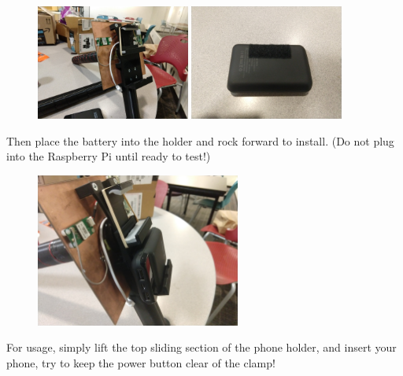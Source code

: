 \documentclass[paper=a4,parskip=full+]{scrartcl}
\begin{document}
\begin{figure}[H]
    \centering
    \includegraphics[width=0.45\textwidth]{Rubber_Band_and_Velcro.jpg} %
    \includegraphics[width=0.45\textwidth]{Battery_Velcro.jpg} %
\end{figure}

Then place the battery into the holder and rock forward to install. (Do not plug into the Raspberry Pi until ready to test!)

\begin{figure}[H]
    \centering
    \includegraphics[width=0.6\textwidth]{Battery_Inserted.jpg} %
\end{figure}

For usage, simply lift the top sliding section of the phone holder, and insert your phone, try to keep the power button clear of the clamp!
\end{document}

